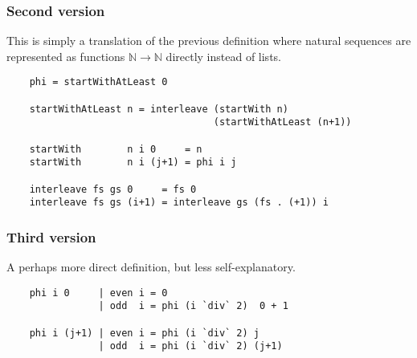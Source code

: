 \documentclass[envcountsame]{llncs}
\newcommand{\N}{\mathbb{N}}
\begin{document}
\subsubsection{Second version} This is simply a translation of the previous definition where natural sequences are represented as functions $\N\to\N$ directly instead of lists.\begin{verbatim}
    phi = startWithAtLeast 0
    
    startWithAtLeast n = interleave (startWith n) 
                                    (startWithAtLeast (n+1))
    
    startWith        n i 0     = n
    startWith        n i (j+1) = phi i j
    
    interleave fs gs 0     = fs 0 
    interleave fs gs (i+1) = interleave gs (fs . (+1)) i
\end{verbatim}

\subsubsection{Third version} A perhaps more direct definition, but less self-explanatory.
\begin{verbatim}
    phi i 0     | even i = 0 
                | odd  i = phi (i `div` 2)  0 + 1
                
    phi i (j+1) | even i = phi (i `div` 2) j
                | odd  i = phi (i `div` 2) (j+1)    
\end{verbatim}
\end{document}
